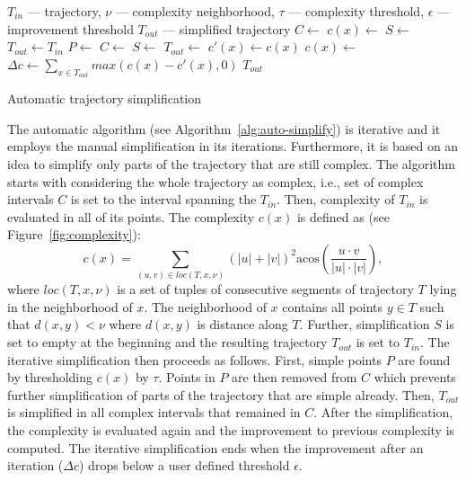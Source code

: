 \begin{algorithm}
  \begin{algorithmic}[1]
	  \Require $T_{in}$ --- trajectory, $\nu$ --- complexity neighborhood, $\tau$ --- complexity threshold, $\epsilon$ --- improvement threshold
	  \Ensure $T_{out}$ --- simplified trajectory
			\State $C \gets$  
			\State $c(x) \gets$ 
			\State
			\State $S \gets$  
			\State $T_{out} \gets T_{in}$
			\Repeat
			  \State $P \gets$ 
				\State $C \gets$ 
			  \State
				  \State $S \gets$ 
					\State $T_{out} \gets$ 
			  \EndFor
				\State
				\State $c'(x) \gets c(x)$ %
				\State $c(x) \gets$ 
				\State
				\State $\Delta c \gets \sum_{x \in T_{out}}{max(c(x) - c'(x), 0)}$
				\State {}
			\State
			\State \Return $T_{out}$
		\EndProcedure
  \end{algorithmic}
	\caption{Automatic trajectory simplification}
  \label{alg:auto-simplify}
\end{algorithm}

The automatic algorithm (see Algorithm~\ref{alg:auto-simplify}) is iterative and it employs the manual simplification in its iterations.
Furthermore, it is based on an idea to simplify only parts of the trajectory that are still complex.
The algorithm starts with considering the whole trajectory as complex, i.e., set of complex intervals $C$ is set to the interval spanning the $T_{in}$.
Then, complexity of $T_{in}$ is evaluated in all of its points.
The complexity $c(x)$ is defined as (see Figure~\ref{fig:complexity}):
\begin{equation}
  c(x) = \sum_{(u, v) \in loc(T, x, \nu)}{(|u| + |v|)^2 \mathrm{acos}(\frac{u \cdot v}{|u| \cdot |v|})},
\label{eq:complexity}
\end{equation}
where $loc(T, x, \nu)$ is a set of tuples of consecutive segments of trajectory $T$ lying in the neighborhood of $x$.
The neighborhood of $x$ contains all points $y \in T$ such that $d(x, y) < \nu$ where $d(x, y)$ is distance along $T$.
Further, simplification $S$ is set to empty at the beginning and the resulting trajectory $T_{out}$ is set to $T_{in}$.
The iterative simplification then proceeds as follows.
First, simple points $P$ are found by thresholding $c(x)$ by $\tau$.
Points in $P$ are then removed from $C$ which prevents further simplification of parts of the trajectory that are simple already.
Then, $T_{out}$ is simplified in all complex intervals that remained in $C$.
After the simplification, the complexity is evaluated again and the improvement to previous complexity is computed.
The iterative simplification ends when the improvement after an iteration ($\Delta c$) drops below a user defined threshold $\epsilon$.